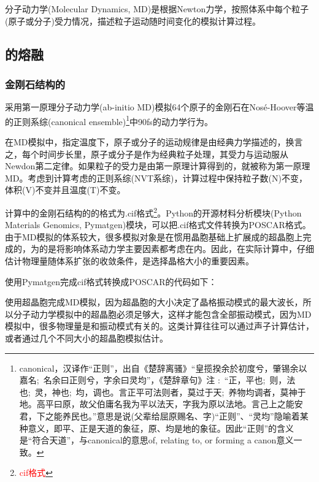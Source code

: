 分子动力学\textrm{(Molecular Dynamics, MD)}是根据\textrm{Newton}力学，按照体系中每个粒子(原子或分子)受力情况，描述粒子运动随时间变化的模拟计算过程。

\subsection{的熔融}
\subsubsection{金刚石结构的}
采用第一原理分子动力学\textrm{(ab-initio MD)}模拟64个原子的金刚石在\textrm{Nos\'e-Hoover}等温的正则系综\textrm{(canonical ensemble)}\footnote{\textrm{canonical}，汉译作``正则''，出自《楚辞\textperiodcentered 离骚》``皇揽揆余於初度兮，肇锡余以嘉名;~名余曰正则兮，字余曰灵均''，《楚辞章句》注%
:~``正，平也;~则，法也;~灵，神也;~均，调也。言正平可法则者，莫过于天;~养物均调者，莫神于地。高平曰原，故父伯庸名我为平以法天，字我为原以法地。言己上之能安君，下之能养民也。''意思是说(父辈给屈原赐名、字)``正则''、``灵均''隐喻着某种意义，即平、正是天道的象征，原、均是地的象征。因此``正则''的含义是``符合天道''，与\textrm{canonical}的意思\textrm{of, relating to, or forming a canon}意义一致。}中90\textrm{fs}的动力学行为。

在\textrm{MD}模拟中，指定温度下，原子或分子的运动规律是由经典力学描述的，换言之，每个时间步长里，原子或分子是作为经典粒子处理，其受力与运动服从\textrm{Newdon}第二定律。如果粒子的受力是由第一原理计算得到的，就被称为第一原理\textrm{MD}。考虑到计算考虑的正则系综(\textrm{NVT}系综)，计算过程中保持粒子数\textrm{(N)}不变，体积\textrm{(V)}不变并且温度\textrm{(T)}不变。

计算中的金刚石结构的的格式为\textrm{.cif}格式\footnote{\textcolor{red}{\textrm{cif}格式}}。\textrm{Python}的开源材料分析模块\textrm{(Python Materials Genomics, Pymatgen)}模块，可以把\textrm{.cif}格式文件转换为\textrm{POSCAR}格式。由于\textrm{MD}模拟的体系较大，很多模拟对象是在惯用晶胞基础上扩展成的超晶胞上完成的，为的是将影响体系动力学主要因素都考虑在内。因此，在实际计算中，仔细估计物理量随体系扩张的收敛条件，是选择晶格大小的重要因素。

使用\textrm{Pymatgen}完成\textrm{cif}格式转换成\textrm{POSCAR}的代码如下：

使用超晶胞完成\textrm{MD}模拟，因为超晶胞的大小决定了晶格振动模式的最大波长，所以分子动力学模拟中的超晶胞必须足够大，这样才能包含全部振动模式，因为\textrm{MD}模拟中，很多物理量是和振动模式有关的。这类计算往往可以通过声子计算估计，或者通过几个不同大小的超晶胞模拟估计。

